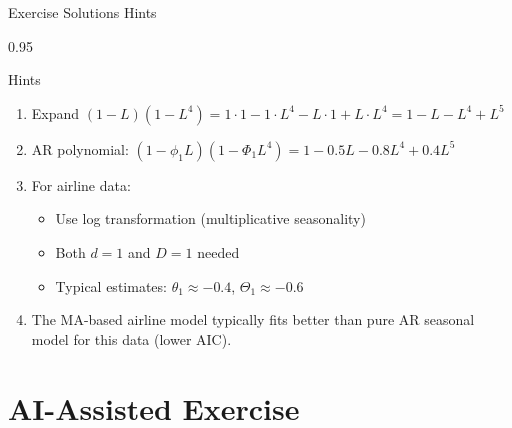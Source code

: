 \documentclass[9pt, aspectratio=169, t]{beamer}
\begin{document}
\begin{frame}{Exercise Solutions Hints}
    \begin{cminipage}{0.95\textwidth}
    {\small
    \begin{block}{Hints}
        \begin{enumerate}
            \item Expand $(1-L)(1-L^4) = 1 \cdot 1 - 1 \cdot L^4 - L \cdot 1 + L \cdot L^4 = 1 - L - L^4 + L^5$

            \vspace{0.1cm}
            \item AR polynomial: $(1 - \phi_1 L)(1 - \Phi_1 L^4) = 1 - 0.5L - 0.8L^4 + 0.4L^5$

            \vspace{0.1cm}
            \item For airline data:
                \begin{itemize}\setlength{\itemsep}{0pt}
                    \item Use log transformation (multiplicative seasonality)
                    \item Both $d=1$ and $D=1$ needed
                    \item Typical estimates: $\theta_1 \approx -0.4$, $\Theta_1 \approx -0.6$
                \end{itemize}

            \vspace{0.1cm}
            \item The MA-based airline model typically fits better than pure AR seasonal model for this data (lower AIC).
        \end{enumerate}
    \end{block}
    }
    \end{cminipage}
\end{frame}

\section{AI-Assisted Exercise}
\end{document}
